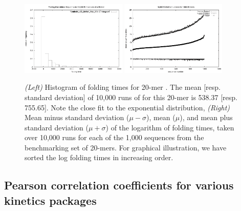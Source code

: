 \begin{figure}[!ht]
\centering
\includegraphics[width=0.45\textwidth]{Figures/Hermes/kinfoldTimeDist.pdf}
\quad
\includegraphics[width=0.45\textwidth]{Figures/Hermes/kinfoldMeanStdev.pdf}
\caption{{\em (Left)} Histogram of \kinfold folding times for 20-mer
. The mean [resp. standard deviation] of 10,000 runs of \kinfold for this 20-mer is 538.37 [resp. 755.65]. Note the close fit to the exponential distribution, {\em (Right)} Mean minus standard deviation ($\mu -\sigma$), mean ($\mu$), and mean plus standard deviation ($\mu + \sigma$) of the logarithm of \kinfold folding times, taken over 10,000 runs for each of the 1,000 sequences from the benchmarking set of 20-mers. For graphical illustration, we have sorted the log folding times in increasing order.}
\label{fig:hermes:kinfoldMeanStdev}
\end{figure}

\subsection{Pearson correlation coefficients for various kinetics packages}
\label{subsec:hermes:corr}

